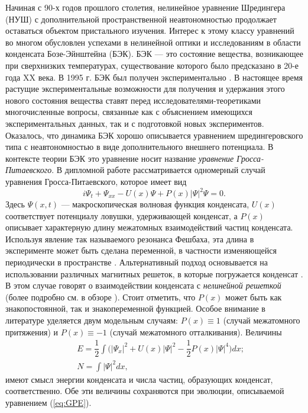 \intro


Начиная с 90-х годов прошлого столетия, нелинейное уравнение Шредингера (НУШ) с дополнительной пространственной неавтономностью продолжает оставаться объектом пристального изучения.
Интерес к этому классу уравнений во многом обусловлен успехами в нелинейной оптики и исследованиям в области конденсата Бозе-Эйнштейна (БЭК).
БЭК --- это состояние вещества, возникающее при сверхнизких температурах, существование которого было предсказано в 20-е года XX века.
В 1995 г. БЭК был получен экспериментально \cite{Anderson}.
В настоящее время растущие экспериментальные возможности для получения и удержания этого нового состояния вещества ставят перед исследователями-теоретиками многочисленные вопросы, связанные как с объяснением имеющихся экспериментальных данных, так и с подготовкой новых экспериментов.
Оказалось, что динамика БЭК хорошо описывается уравнением шредингеровского типа с неавтономностью в виде дополнительного внешнего потенциала.
В контексте теории БЭК это уравнение носит название {\it уравнение Гросса-Питаевского}.
В дипломной работе рассматривается одномерный случай уравнения Гросса-Питаевского, которое имеет вид
%
\begin{equation}
i \Psi_t + \Psi_{xx} - U(x)\Psi + P(x)|\Psi|^2 \Psi = 0.
\label{eq:GPE}
\end{equation}
%
Здесь $\Psi(x, t)$ --- макроскопическая волновая функция конденсата, $U(x)$ соответствует потенциалу ловушки, удерживающей конденсат, а $P(x)$ описывает характерную длину межатомных взаимодействий частиц конденсата.
Используя явление так называемого резонанса Фешбаха, эта длина в эксперименте может быть сделана переменной, в частности изменяющейся периодически в пространстве \cite{Theis}.
Альтернативный подход основывается на использовании различных магнитных решеток, в которые погружается конденсат \cite{Jose}.
В этом случае говорят о взаимодействии конденсата с {\it нелинейной решеткой} (более подробно см. в обзоре \cite{Kartashov}).
Стоит отметить, что $P(x)$ может быть как знакопостоянной, так и знакопеременной функцией.
Особое внимание в литературе уделяется двум модельным случаям: $P(x) \equiv 1$ (случай межатомного притяжения) и $P(x) \equiv -1$ (случай межатомного отталкивания).
Величины
%
\begin{eqnarray}
&& E = \dfrac{1}{2} \int \Big( |\Psi_{x}|^2 + U(x) |\Psi|^2 - \dfrac{1}{2} P(x) |\Psi|^4 \Big) dx; \label{eq:energy} \\ 
&& N = \int |\Psi|^2 dx, \label{eq:norm}
\end{eqnarray}
%
имеют смысл энергии конденсата и числа частиц, образующих конденсат, соответственно.
Обе эти величины сохраняются при эволюции, описываемой уравнением (\ref{eq:GPE}).


